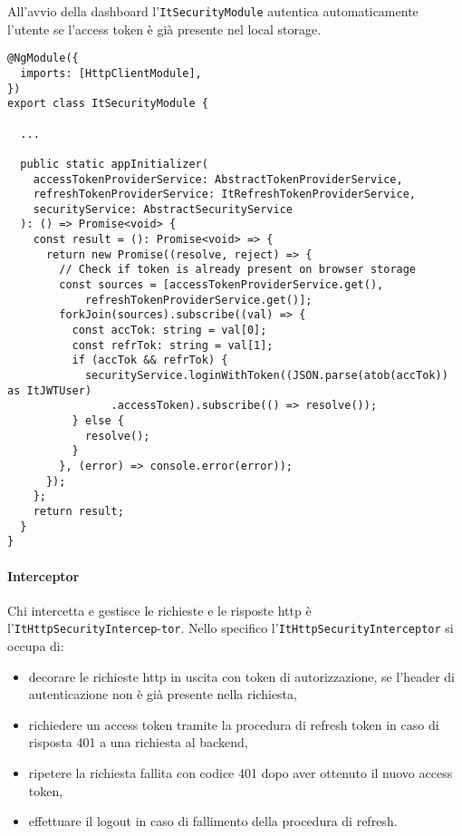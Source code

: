 All'avvio della dashboard l'\verb|ItSecurityModule| autentica automaticamente l'utente se l'access token è già presente nel local storage.\newline
\begin{lstlisting}[caption={Login con token nell'ItSecurityModule}, style=javaScriptCode]
@NgModule({
  imports: [HttpClientModule],
})
export class ItSecurityModule {
    
  ...

  public static appInitializer(
    accessTokenProviderService: AbstractTokenProviderService,
    refreshTokenProviderService: ItRefreshTokenProviderService,
    securityService: AbstractSecurityService
  ): () => Promise<void> {
    const result = (): Promise<void> => {
      return new Promise((resolve, reject) => {
        // Check if token is already present on browser storage
        const sources = [accessTokenProviderService.get(), 
            refreshTokenProviderService.get()];
        forkJoin(sources).subscribe((val) => {
          const accTok: string = val[0];
          const refrTok: string = val[1];
          if (accTok && refrTok) {
            securityService.loginWithToken((JSON.parse(atob(accTok)) as ItJWTUser)
                .accessToken).subscribe(() => resolve());
          } else {
            resolve();
          }
        }, (error) => console.error(error));
      });
    };
    return result;
  }
}
\end{lstlisting}
\pagebreak
\paragraph{Interceptor} Chi intercetta e gestisce le richieste e le risposte http è l'\verb|ItHttpSecurityIntercep|-\verb|tor|.
Nello specifico l'\verb|ItHttpSecurityInterceptor| si occupa di: 
\begin{itemize}
    \item decorare le richieste http in uscita con token di autorizzazione, se l'header di autenticazione non è già presente nella richiesta,
    \item richiedere un access token tramite la procedura di refresh token in caso di risposta 401 a una richiesta al backend,
    \item ripetere la richiesta fallita con codice 401 dopo aver ottenuto il nuovo access token, 
    \item effettuare il logout in caso di fallimento della procedura di refresh.
\end{itemize}